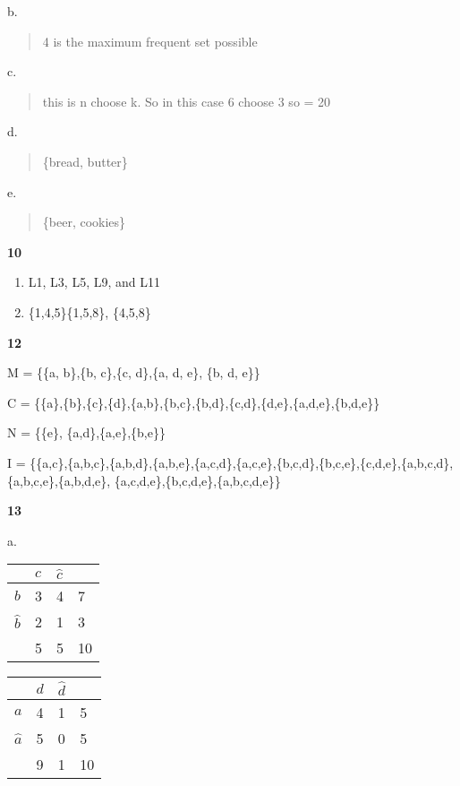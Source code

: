 \documentclass[11pt]{article}
\begin{document}
b.

\begin{quote}
4 is the maximum frequent set possible
\end{quote}

c.

\begin{quote}
this is n choose k. So in this case 6 choose 3 so = 20
\end{quote}

d.

\begin{quote}
\{bread, butter\}
\end{quote}

e.

\begin{quote}
\{beer, cookies\}
\end{quote}

\textbf{10}

\begin{enumerate}
\def\labelenumi{\alph{enumi})}
\item
  L1, L3, L5, L9, and L11 
\item
  \{1,4,5\}\{1,5,8\}, \{4,5,8\} 
\end{enumerate}

\textbf{12}

M = \{\{a, b\},\{b, c\},\{c, d\},\{a, d, e\}, \{b, d, e\}\}

C =
\{\{a\},\{b\},\{c\},\{d\},\{a,b\},\{b,c\},\{b,d\},\{c,d\},\{d,e\},\{a,d,e\},\{b,d,e\}\}

N = \{\{e\}, \{a,d\},\{a,e\},\{b,e\}\}

I =
\{\{a,c\},\{a,b,c\},\{a,b,d\},\{a,b,e\},\{a,c,d\},\{a,c,e\},\{b,c,d\},\{b,c,e\},\{c,d,e\},\{a,b,c,d\},\{a,b,c,e\},\{a,b,d,e\},
\{a,c,d,e\},\{b,c,d,e\},\{a,b,c,d,e\}\}

\textbf{13}

a.

\begin{longtable}[]{@{}llll@{}}
\toprule
& \(c\) & \(\hat{c}\) &\tabularnewline
\midrule
\endhead
\(b\) & 3 & 4 & 7\tabularnewline
\(\hat{b}\) & 2 & 1 & 3\tabularnewline
& 5 & 5 & 10\tabularnewline
\bottomrule
\end{longtable}

\begin{longtable}[]{@{}llll@{}}
\toprule
& \(d\) & \(\hat{d}\) &\tabularnewline
\midrule
\endhead
\(a\) & 4 & 1 & 5\tabularnewline
\(\hat{a}\) & 5 & 0 & 5\tabularnewline
& 9 & 1 & 10\tabularnewline
\bottomrule
\end{longtable}
\end{document}
